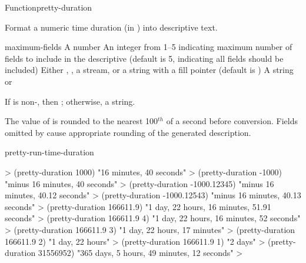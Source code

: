 \documentclass[10pt,twoside,english,pdftex]{article}
\begin{document}
\begin{functiondoc}{Function}{pretty-duration}{%
    }
% 

\fnsyntax

\fnpurpose Format a numeric time duration (in ) into
descriptive text.

\fnpackage {}

\fnmodule {}

\fnargs
\begin{args}{maximum-fields}
\arg[seconds] A number
 An integer from 1--5 indicating maximum number of fields 
to include in the descriptive  (default is 5, indicating all 
fields should be included)
\arg[destination] Either \nil, , a stream, or a string with a fill 
pointer (default is \nil)
\arg[result] A string or \nil{}
\end{args}

\fnreturns If  is non-\nil, then \nil; otherwise, a string.

\fndescription The value of  is rounded to the nearest
100$^{th}$ of a second before conversion.  Fields omitted by
 cause appropriate rounding of the generated
description.

\begin{alsos}{pretty-run-time-duration}
\end{alsos}

\fnexamples
%
\W\supp
\begin{example}
  > (pretty-duration 1000)
  "16 minutes, 40 seconds"
  > (pretty-duration -1000)
  "minus 16 minutes, 40 seconds"
  > (pretty-duration -1000.12345)
  "minus 16 minutes, 40.12 seconds"
  > (pretty-duration -1000.12543)
  "minus 16 minutes, 40.13 seconds"\goodpagebreak
  > (pretty-duration 166611.9)
  "1 day, 22 hours, 16 minutes, 51.91 seconds"
  > (pretty-duration 166611.9 4)
  "1 day, 22 hours, 16 minutes, 52 seconds"
  > (pretty-duration 166611.9 3)
  "1 day, 22 hours, 17 minutes"
  > (pretty-duration 166611.9 2)
  "1 day, 22 hours"
  > (pretty-duration 166611.9 1)
  "2 days"\goodpagebreak
  > (pretty-duration 31556952)
  "365 days, 5 hours, 49 minutes, 12 seconds"
  >
\end{example}

\end{functiondoc}
\end{document}
